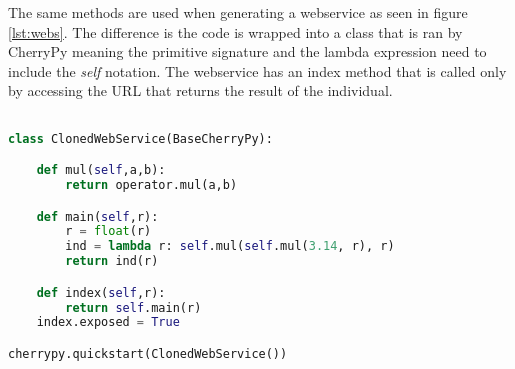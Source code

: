 The same methods are used when generating a webservice as seen in figure \ref{lst:webs}. The difference is the code is wrapped into a class that is ran
by CherryPy meaning the primitive signature and the lambda expression need to include the \textit{self} notation. The webservice has
an index method that is called only by accessing the URL that returns the result of the individual.

\begin{lstlisting}[language=Python,caption={A generated web service that is the result of the Darwin framework},label={lst:webs}]

class ClonedWebService(BaseCherryPy):

    def mul(self,a,b):
        return operator.mul(a,b)

    def main(self,r):
        r = float(r)
        ind = lambda r: self.mul(self.mul(3.14, r), r)
        return ind(r)

    def index(self,r):
        return self.main(r)
    index.exposed = True

cherrypy.quickstart(ClonedWebService())
\end{lstlisting}